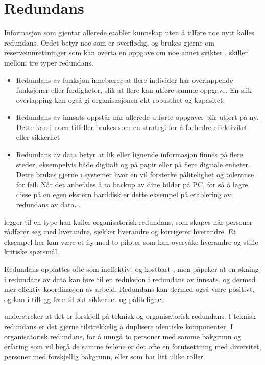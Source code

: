 \section{Redundans}
\label{sec:redundans}

Informasjon som gjentar allerede etabler kunnskap uten å tilføre noe nytt kalles redundans. Ordet betyr noe som er overflødig, og brukes gjerne om reserveinnrettninger som kan overta en oppgave om noe annet svikter \citep{Rosness}.  \citet{Cabitza} skiller mellom tre typer redundans. 

\begin{itemize}
\item Redundans av funksjon innebærer at flere individer har overlappende funksjoner eller ferdigheter, slik at flere kan utføre samme oppgave. En slik overlapping kan også gi organisasjonen økt robusthet og kapasitet.
\item Redundans av innsats oppstår når allerede utførte oppgaver blir utført på ny. Dette kan i noen tilfeller brukes som en strategi for å forbedre effektivitet eller sikkerhet \citep{Rygh13}
\item Redundans av data betyr at lik eller lignende informasjon finnes på flere steder, eksempelvis både digitalt og på papir eller på flere digitale enheter. Dette brukes gjerne i systemer hvor en vil forsterke pålitelighet og toleranse for feil. Når det anbefales å ta backup av dine bilder på PC, for så å lagre disse på en egen ekstern harddisk er dette eksempel på etablering av redundans av data. \citep{Rygh13}.
\end{itemize}

\noindent
\citet{Rosness} legger til en type han kaller organisatorisk redundans, som skapes når personer rådfører seg med hverandre, sjekker hverandre og korrigerer hverandre. Et eksempel her kan være et fly med to piloter som kan overvåke hverandre og stille kritiske spørsmål. 

\noindent
Redundans oppfattes ofte som ineffektivt og kostbart \citep{Rygh13}, men \citet{Cabitza} påpeker at en økning i redundans av data kan føre til en reduksjon i redundans av innsats, og dermed mer effektiv koordinasjon av arbeid. Redundans kan dermed også være positivt, og kan i tillegg føre til økt sikkerhet og pålitelighet \citep{Rygh13}.

\noindent
\citet{Rosness} understreker at det er forskjell på teknisk og organisatorisk redundans. I teknisk redundans er det gjerne tilstrekkelig å duplisere identiske komponenter. I organisatorisk redundans, for å unngå to personer med samme bakgrunn og erfaring som vil begå de samme feilene er det ofte en forutsettning med diversitet, personer med forskjellig bakgrunn, eller som har litt ulike roller.
